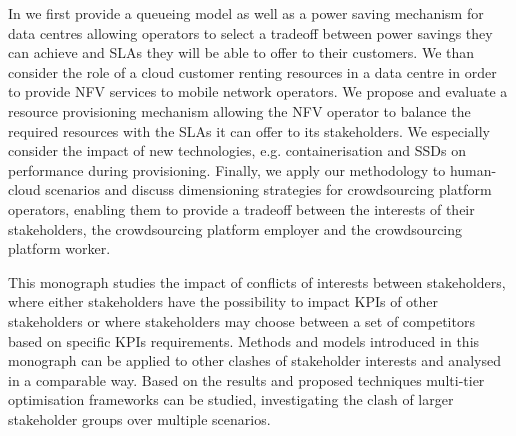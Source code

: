 In  we first provide a queueing model as well as a power saving mechanism for data centres allowing operators to select a tradeoff between power savings they can achieve and \glspl{SLA} they will be able to offer to their customers.
We than consider the role of a cloud customer renting resources in a data centre in order to provide \gls{NFV} services to mobile network operators.
We propose and evaluate a resource provisioning mechanism allowing the \gls{NFV} operator to balance the required resources with the \glspl{SLA} it can offer to its stakeholders. 
We especially consider the impact of new technologies, e.g. containerisation and \glspl{SSD} on performance during provisioning.
Finally, we apply our methodology to human-cloud scenarios and discuss dimensioning strategies for crowdsourcing platform operators, enabling them to provide a tradeoff between the interests of their stakeholders, the crowdsourcing platform employer and the crowdsourcing platform worker. 

This monograph studies the impact of conflicts of interests between stakeholders, where either stakeholders have the possibility to impact \glspl{KPI} of other stakeholders or where stakeholders may choose between a set of competitors based on specific \glspl{KPI} requirements.
Methods and models introduced in this monograph can be applied to other clashes of stakeholder interests and analysed in a comparable way.
Based on the results and proposed techniques multi-tier optimisation frameworks can be studied, investigating the clash of larger stakeholder groups over multiple scenarios.